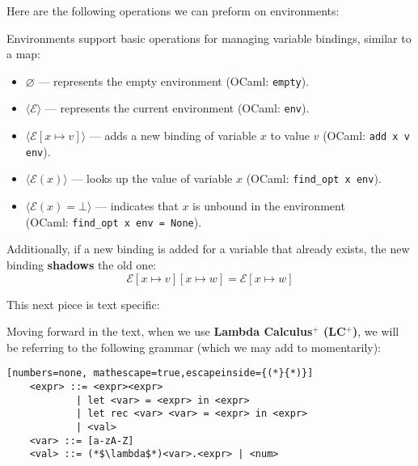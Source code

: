 \newpage
\noindent
Here are the following operations we can preform on environments:
\begin{Def}

   \label{def:env-operations}

   \noindent
   Environments support basic operations for managing variable bindings, similar to a map:

   \begin{itemize}
       \item \(\varnothing\) — represents the empty environment (OCaml: \texttt{empty}).
       \item $\langle\mathcal{E} \rangle$ — represents the current environment (OCaml: \texttt{env}).
       \item $\langle\mathcal{E}[x \mapsto v] \rangle$ — adds a new binding of variable \(x\) to value \(v\) (OCaml: \texttt{add x v env}).
       
       \item $\langle\mathcal{E}(x) \rangle$ — looks up the value of variable \(x\) (OCaml: \texttt{find\_opt x env}).
       
       \item $\langle\mathcal{E}(x) = \bot \rangle$ — indicates that \(x\) is unbound in the environment\\ (OCaml: \texttt{find\_opt x env = None}).
   \end{itemize}

   \noindent
   Additionally, if a new binding is added for a variable that already exists, the new binding \textbf{shadows} the old one:
   \[
   \mathcal{E}[x \mapsto v][x \mapsto w] = \mathcal{E}[x \mapsto w]
   \]
\end{Def}
\noindent
This next piece is text specific:
\begin{Def}

Moving forward in the text, when we use \textbf{Lambda Calculus$^+$ (LC$^+$)}, we will be referring to the following grammar (which we may add to momentarily):

\begin{lstlisting}[numbers=none, mathescape=true,escapeinside={(*}{*)}]
    <expr> ::= <expr><expr>
            | let <var> = <expr> in <expr>
            | let rec <var> <var> = <expr> in <expr>
            | <val>
    <var> ::= [a-zA-Z]
    <val> ::= (*$\lambda$*)<var>.<expr> | <num>
    \end{lstlisting}

\end{Def}        

